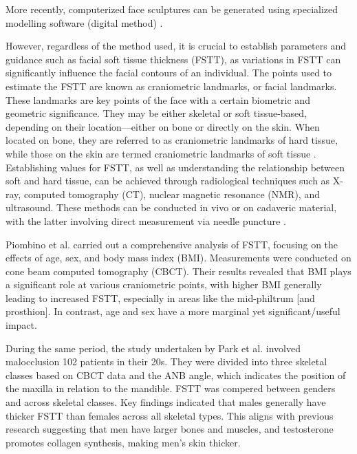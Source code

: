 \documentclass[journal,article,submit,pdftex,moreauthors]{Definitions/mdpi}
\begin{document}
More recently, computerized face sculptures can be generated using specialized modelling software (digital method) \cite{ref11}.

However, regardless of the method used, it is crucial to establish parameters and guidance such as facial soft tissue thickness (FSTT), as variations in FSTT can significantly influence the facial contours of an individual. The points used to estimate the FSTT are known as craniometric landmarks, or facial landmarks. These landmarks are key points of the face with a certain biometric and geometric significance. They may be either skeletal or soft tissue-based, depending on their location—either on bone or directly on the skin. When located on bone, they are referred to as craniometric landmarks of hard tissue, while those on the skin are termed craniometric landmarks of soft tissue \citep{ref4,ref7,ref12}. Establishing values for FSTT, as well as understanding the relationship between soft and hard tissue, can be achieved through radiological techniques such as X-ray, computed tomography (CT), nuclear magnetic resonance (NMR), and ultrasound. These methods can be conducted in vivo or on cadaveric material, with the latter involving direct measurement via needle puncture \citep{ref13,ref14,ref15,ref16,ref17,ref18}.

Piombino et al. \cite{ref19} carried out a comprehensive analysis of FSTT, focusing on the effects of age, sex, and body mass index (BMI). Measurements were conducted on cone beam computed tomography (CBCT). Their results revealed that BMI plays a significant role at various craniometric points, with higher BMI generally leading to increased FSTT, especially in areas like the mid-philtrum [and prosthion]. In contrast, age and sex have a more marginal yet significant/useful impact.

During the same period, the study undertaken by Park et al. \cite{ref2} involved malocclusion 102 patients in their 20s. They were divided into three skeletal classes based on CBCT data and the ANB angle, which indicates the position of the maxilla in relation to the mandible. FSTT was compered between genders and across skeletal classes. Key findings indicated that males generally have thicker FSTT than females across all skeletal types. This aligns with previous research suggesting that men have larger bones and muscles, and testosterone promotes collagen synthesis, making men’s skin thicker.
\end{document}
